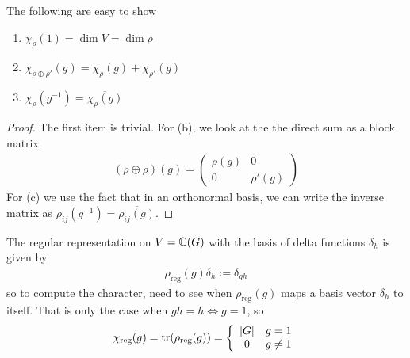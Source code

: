 \begin{lem}[]
  The following are easy to show
\begin{enumerate}
  \item $\chi_{\rho}(1) = \dim V = \dim \rho$
  \item $\chi_{\rho \oplus \rho'}(g) = \chi_{\rho}(g) + \chi_{\rho'}(g)$
  \item $\chi_{\rho}(g^{-1}) = \overline{\chi_{\rho}(g)}$
\end{enumerate}
\end{lem}
\begin{proof}
  The first item is trivial. For (b), we look at the the direct sum as a block matrix
  \begin{align*}
    (\rho \oplus \rho)(g) = \begin{pmatrix}
      \rho(g) & 0\\
      0 & \rho'(g)
    \end{pmatrix}
  \end{align*}
  For (c) we use the fact that in an orthonormal basis, we can write the inverse matrix as $\rho_{ij}(g^{-1}) = \overline{\rho_{ij}(g)}$.
\end{proof}


\begin{ex}
  The regular representation on $V =\mathbb{C}(G)$ with the basis of delta functions $\delta_h$ is given by
  \begin{align*}
    \rho_{\text{reg}}(g) \delta_h := \delta_{gh}
  \end{align*}
  so to compute the character, need to see when $\rho_{\text{reg}}(g)$ maps a basis vector $\delta_h$ to itself. That is only the case when $gh = h \iff g= 1$, so
  \begin{align*}
    \chi_{\text{reg}}(g) = \operatorname{tr}(\rho_{\text{reg}}(g)) = \left\{\begin{array}{cl}
      \vert G\vert & g = 1\\
      0 & g \neq 1
    \end{array} \right.
  \end{align*}
\end{ex}

